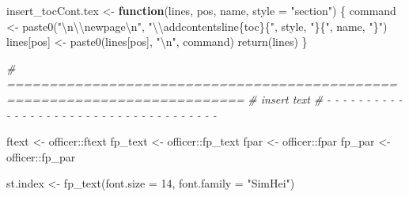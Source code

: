 \documentclass[
]{article}
\newenvironment{Shaded}{\begin{snugshade}}{\end{snugshade}}
\newcommand{\AttributeTok}[1]{\textcolor[rgb]{0.77,0.63,0.00}{#1}}
\newcommand{\CommentTok}[1]{\textcolor[rgb]{0.56,0.35,0.01}{\textit{#1}}}
\newcommand{\ControlFlowTok}[1]{\textcolor[rgb]{0.13,0.29,0.53}{\textbf{#1}}}
\newcommand{\DecValTok}[1]{\textcolor[rgb]{0.00,0.00,0.81}{#1}}
\newcommand{\FunctionTok}[1]{\textcolor[rgb]{0.00,0.00,0.00}{#1}}
\newcommand{\NormalTok}[1]{#1}
\newcommand{\OtherTok}[1]{\textcolor[rgb]{0.56,0.35,0.01}{#1}}
\newcommand{\SpecialCharTok}[1]{\textcolor[rgb]{0.00,0.00,0.00}{#1}}
\newcommand{\StringTok}[1]{\textcolor[rgb]{0.31,0.60,0.02}{#1}}
\begin{document}
\begin{Shaded}
\begin{Highlighting}[]
\NormalTok{insert\_tocCont.tex }\OtherTok{\textless{}{-}} \ControlFlowTok{function}\NormalTok{(lines, pos, name, }\AttributeTok{style =} \StringTok{"section"}\NormalTok{) \{}
\NormalTok{  command }\OtherTok{\textless{}{-}} \FunctionTok{paste0}\NormalTok{(}\StringTok{"}\SpecialCharTok{\textbackslash{}n\textbackslash{}\textbackslash{}}\StringTok{newpage}\SpecialCharTok{\textbackslash{}n}\StringTok{"}\NormalTok{, }\StringTok{"}\SpecialCharTok{\textbackslash{}\textbackslash{}}\StringTok{addcontentsline\{toc\}\{"}\NormalTok{, style, }\StringTok{"\}\{"}\NormalTok{, name, }\StringTok{"\}"}\NormalTok{)}
\NormalTok{  lines[pos] }\OtherTok{\textless{}{-}} \FunctionTok{paste0}\NormalTok{(lines[pos], }\StringTok{"}\SpecialCharTok{\textbackslash{}n}\StringTok{"}\NormalTok{, command)}
  \FunctionTok{return}\NormalTok{(lines)}
\NormalTok{\}}
\end{Highlighting}
\end{Shaded}

\begin{Shaded}
\begin{Highlighting}[]
\CommentTok{\# ==========================================================================}
\CommentTok{\# insert text}
\CommentTok{\# {-} {-} {-} {-} {-} {-} {-} {-} {-} {-} {-} {-} {-} {-} {-} {-} {-} {-} {-} {-} {-} {-} {-} {-} {-} {-} {-} {-} {-} {-} {-} {-} {-} {-} {-} {-} {-}}

\NormalTok{ftext }\OtherTok{\textless{}{-}}\NormalTok{ officer}\SpecialCharTok{::}\NormalTok{ftext}
\NormalTok{fp\_text }\OtherTok{\textless{}{-}}\NormalTok{ officer}\SpecialCharTok{::}\NormalTok{fp\_text}
\NormalTok{fpar }\OtherTok{\textless{}{-}}\NormalTok{ officer}\SpecialCharTok{::}\NormalTok{fpar}
\NormalTok{fp\_par }\OtherTok{\textless{}{-}}\NormalTok{ officer}\SpecialCharTok{::}\NormalTok{fp\_par}

\NormalTok{st.index }\OtherTok{\textless{}{-}} \FunctionTok{fp\_text}\NormalTok{(}\AttributeTok{font.size =} \DecValTok{14}\NormalTok{, }\AttributeTok{font.family =} \StringTok{"SimHei"}\NormalTok{)}
\end{Highlighting}
\end{Shaded}
\end{document}
